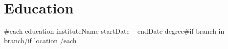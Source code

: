 \section{Education}
\vspace{0pt}

\resumeSubHeadingListStart

    {{#each education}}
    \resumeSubheading
    { {{instituteName}} }{ {{startDate}} -- {{endDate}} }
    { {{degree}}{{#if branch}} in {{branch}}{{/if}} }{ {{location}} }
    {{/each}}

\resumeSubHeadingListEnd
\vspace{-4mm}

